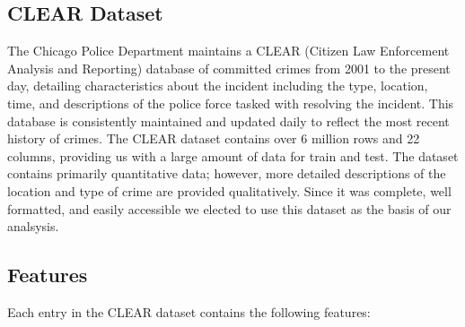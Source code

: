 \documentclass[10pt]{SelfArx} %
\begin{document}
    \subsection{CLEAR Dataset}
    The Chicago Police Department maintains a CLEAR (Citizen Law Enforcement Analysis and Reporting) database of committed crimes from 2001 to the present day, detailing characteristics about the incident including the type, location, time, and descriptions of the police force tasked with resolving the incident. This database is consistently maintained and updated daily to reflect the most recent history of crimes. The CLEAR dataset contains over 6 million rows and 22 columns, providing us with a large amount of data for train and test. The dataset contains primarily quantitative data; however, more detailed descriptions of the location and type of crime are provided qualitatively. Since it was complete, well formatted, and easily accessible we elected to use this dataset as the basis of our analsysis.

    \subsection{Features}
    Each entry in the CLEAR dataset contains the following features:
\end{document}
